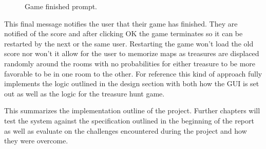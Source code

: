       \begin{figure}[htp]
        \centering
        \caption{Game finished prompt.}
      \end{figure}

      This final message notifies the user that their game has finished. They are notified of the score and after clicking OK the game terminates so it can be restarted by the next or the same user. Restarting the game won't load the old score nor won't it allow for the user to memorize maps as treasures are displaced randomly around the rooms with no probabilities for either treasure to be more favorable to be in one room to the other. For reference this kind of approach fully implements the logic outlined in the design section with both how the GUI is set out as well as the logic for the treasure hunt game.

      This summarizes the implementation outline of the project. Further chapters will test the system against the specification outlined in the beginning of the report as well as evaluate on the challenges encountered during the project and how they were overcome.